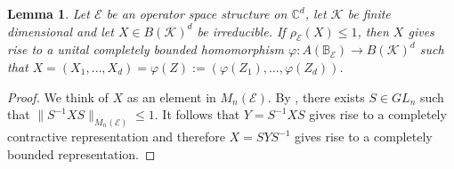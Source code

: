 \documentclass[12pt]{amsart}
\numberwithin{equation}{section}
\newtheorem{lemma}[theorem]{Lemma}
\theoremstyle{definition}
\newcommand{\cE}{\mathcal{E}}
\newcommand{\cK}{\mathcal{K}}
\newcommand{\bB}{\mathbb{B}}
\newcommand{\C}{\mathbb{C}}
\begin{document}
\begin{lemma}\label{lem:specrad_irreducible}
        Let $\cE$ be an operator space structure on $\C^d$, let $\cK$ be finite dimensional and let $X \in B(\cK)^d$ be irreducible. If $\rho_\cE(X) \leq 1$, then $X$ gives rise to a unital completely bounded homomorphism $\varphi \colon A(\bB_\cE) \to B(\cK)^d$ such that $X = (X_1, \ldots, X_d) = \varphi(Z) := (\varphi(Z_1), \ldots, \varphi(Z_d))$. 
\end{lemma}

\begin{proof}
We think of $X$ as an element in $M_n(\cE)$. 
By \cite[Corollary 2.12]{shalsham2025spectral}, there exists $S\in GL_n$ such that $\|S^{-1} X S\|_{M_n(\cE)} \leq 1$. 
It follows that $Y = S^{-1} X S$ gives rise to a completely contractive representation and therefore $X = S Y S^{-1}$ gives rise to a completely bounded representation. 
\end{proof}
\end{document}

